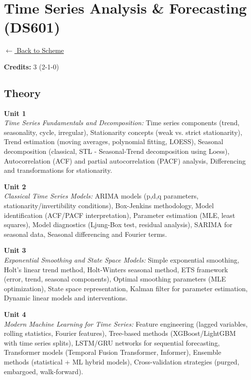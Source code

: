 \section*{Time Series Analysis \& Forecasting (DS601)}
\label{major:DS_6}

\noindent \small{\hyperref[main:scheme]{$\leftarrow$ Back to Scheme}} \vspace{0.5cm}

\noindent \textbf{Credits:} 3 (2-1-0)

\subsection*{Theory}
\noindent\textbf{Unit 1} \\
\textit{Time Series Fundamentals and Decomposition:} Time series components (trend, seasonality, cycle, irregular), Stationarity concepts (weak vs. strict stationarity), Trend estimation (moving averages, polynomial fitting, LOESS), Seasonal decomposition (classical, STL - Seasonal-Trend decomposition using Loess), Autocorrelation (ACF) and partial autocorrelation (PACF) analysis, Differencing and transformations for stationarity.

\vspace{0.3cm}

\noindent\textbf{Unit 2} \\
\textit{Classical Time Series Models:} ARIMA models (p,d,q parameters, stationarity/invertibility conditions), Box-Jenkins methodology, Model identification (ACF/PACF interpretation), Parameter estimation (MLE, least squares), Model diagnostics (Ljung-Box test, residual analysis), SARIMA for seasonal data, Seasonal differencing and Fourier terms.

\vspace{0.3cm}

\noindent\textbf{Unit 3} \\
\textit{Exponential Smoothing and State Space Models:} Simple exponential smoothing, Holt's linear trend method, Holt-Winters seasonal method, ETS framework (error, trend, seasonal components), Optimal smoothing parameters (MLE optimization), State space representation, Kalman filter for parameter estimation, Dynamic linear models and interventions.

\vspace{0.3cm}

\noindent\textbf{Unit 4} \\
\textit{Modern Machine Learning for Time Series:} Feature engineering (lagged variables, rolling statistics, Fourier features), Tree-based methods (XGBoost/LightGBM with time series splits), LSTM/GRU networks for sequential forecasting, Transformer models (Temporal Fusion Transformer, Informer), Ensemble methods (statistical + ML hybrid models), Cross-validation strategies (purged, embargoed, walk-forward).

